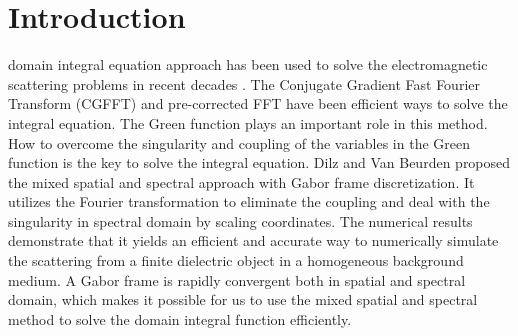 \documentclass[preprint,12pt]{elsarticle}
\begin{document}

\printnomenclature[1in]

\section{Introduction}
\label{introduction}
  domain integral equation approach {has been used} to solve the electromagnetic scattering problems in recent decades \cite{PP1991Aweak, AIM1996EB, Lalanne2007Numerical}. {The Conjugate Gradient Fast Fourier Transform (CGFFT) \cite{Zwamborn1992The} and pre-corrected FFT \cite{Phillips1994Proceedings} have been efficient ways to solve the integral equation.}
 The Green function play{s} an important role in this method. How to overcome the singularity and coupling of the variables in the Green function is the key to solve the integral equation. Dilz and {Van Beurden} \cite{Dilz2016The} proposed 
the mixed spatial and spectral approach with Gabor frame discretization. It utilizes the Fourier transformation to eliminate the coupling and deal with the singularity in spectral domain by scaling coordinates. The numerical results demonstrate that it
yields an efficient and accurate way to numerically simulate the scattering from a finite dielectric object in a homogeneous background medium. A Gabor frame \cite{Bastiaans1981A, Bastiaans1995Gabor} is rapidly convergent both in spatial and spectral domain, which makes it possible for us to use the mixed spatial and spectral method to solve the domain integral function efficiently. 
\end{document}
